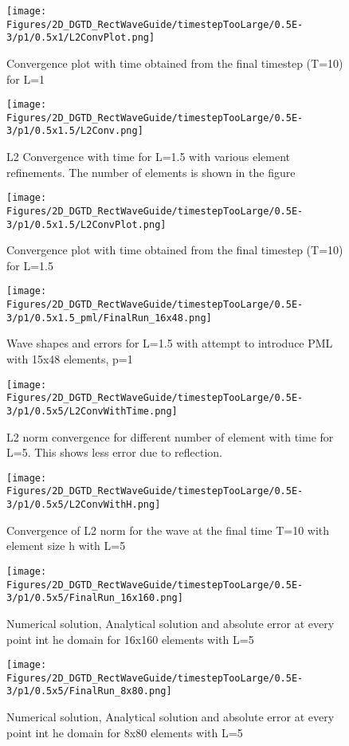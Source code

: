 \begin{figure}
\texttt{[image: Figures/2D\_DGTD\_RectWaveGuide/timestepTooLarge/0.5E-3/p1/0.5x1/L2ConvPlot.png]}
\caption{Convergence plot with time obtained from the final timestep (T=10) for L=1}
\end{figure}

\begin{figure}
\texttt{[image: Figures/2D\_DGTD\_RectWaveGuide/timestepTooLarge/0.5E-3/p1/0.5x1.5/L2Conv.png]}
\caption{L2 Convergence with time for L=1.5 with various element refinements. The number of elements is shown in the figure}
\end{figure}

\begin{figure}
\texttt{[image: Figures/2D\_DGTD\_RectWaveGuide/timestepTooLarge/0.5E-3/p1/0.5x1.5/L2ConvPlot.png]}
\caption{Convergence plot with time obtained from the final timestep (T=10) for L=1.5}
\end{figure}

\begin{figure}
\texttt{[image: Figures/2D\_DGTD\_RectWaveGuide/timestepTooLarge/0.5E-3/p1/0.5x1.5\_pml/FinalRun\_16x48.png]}
\caption{Wave shapes and errors for L=1.5 with attempt to introduce PML with 15x48 elements, p=1}
\end{figure}

\begin{figure}
\texttt{[image: Figures/2D\_DGTD\_RectWaveGuide/timestepTooLarge/0.5E-3/p1/0.5x5/L2ConvWithTime.png]}
\caption{L2 norm convergence for different number of element with time for L=5. This shows less error due to reflection.}
\end{figure}

\begin{figure}
\texttt{[image: Figures/2D\_DGTD\_RectWaveGuide/timestepTooLarge/0.5E-3/p1/0.5x5/L2ConvWithH.png]}
\caption{Convergence of L2 norm for the wave at the final time T=10 with element size h with L=5}
\end{figure}

\begin{figure}
\texttt{[image: Figures/2D\_DGTD\_RectWaveGuide/timestepTooLarge/0.5E-3/p1/0.5x5/FinalRun\_16x160.png]}
\caption{Numerical solution, Analytical solution and absolute error at every point int he domain for 16x160 elements with L=5}
\end{figure}

\begin{figure}
\texttt{[image: Figures/2D\_DGTD\_RectWaveGuide/timestepTooLarge/0.5E-3/p1/0.5x5/FinalRun\_8x80.png]}
\caption{Numerical solution, Analytical solution and absolute error at every point int he domain for 8x80 elements with L=5}
\end{figure}

